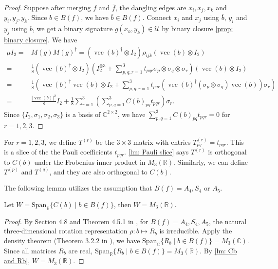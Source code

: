 \begin{proof}
    Suppose after merging $f$ and $\overline{f}$, the dangling edges are $x_i,x_j,x_k$ and $y_i,y_j,y_k$.
    Since $b\in B(f)$, we have $\overline{b}\in B(f)$.
    Connect $x_i$ and $x_j$ using $\overline{b}$, $y_i$ and $y_j$ using $b$, we get a binary signature $g(x_k,y_k)\in \mathcal{U}$ by binary closure \cref{prop: binary closure}.
    We have
    \begin{equation*}
        \begin{aligned}
            \mu I_2
            =&M(g)M(g)^{\dagger}=(\operatorname{vec}(b)^\dagger \otimes I_2) \rho_{ijk}(\operatorname{vec}(b) \otimes I_2)\\
            =&\frac{1}{8}(\operatorname{vec}(b)^\dagger \otimes I_2)\left(I_2^{\otimes3}+\sum_{p,q,r=1}^3 t_{pqr} \sigma_p\otimes\sigma_q\otimes\sigma_r\right)(\operatorname{vec}(b) \otimes I_2)\\
            =& \frac{1}{8}\left(\operatorname{vec}(b)^{\dagger}\operatorname{vec}(b)\otimes I_2+\sum_{p,q,r=1}^3t_{pqr}(\operatorname{vec}(b)^\dagger (\sigma_p\otimes\sigma_q) \operatorname{vec}(b))\sigma_r\right)\\
            =&\frac{|\operatorname{vec}(b)|^2}{8}I_2+\frac{1}{8}\sum_{r=1}^3\left(\sum_{p,q=1}^3 C(b)_{pq}t_{pqr}\right)\sigma_r.&
        \end{aligned}
    \end{equation*}
    Since $\{I_2,\sigma_1,\sigma_2,\sigma_3\}$ is a basis of $\mathbb{C}^{2\times 2}$, we have $\sum_{p,q=1}^3 C(b)_{pq}t_{pqr}=0$ for $r=1,2,3.$
\end{proof}
\begin{remark}
    For $r=1,2,3$, we define $T^{(r)}$ be the $3\times 3$ matrix with entries $T^{(r)}_{pq}=t_{pqr}$.
    This is a slice of the the Pauli coefficients $t_{pqr}.$
    \cref{lm: Pauli slice} says $T^{(r)}$ is orthogonal to $C(b)$ under the Frobenius inner product in $M_3(\mathbb{R}).$
    Similarly, we can define $T^{(p)}$ and $T^{(q)}$, and they are also orthogonal to $C(b)$.
\end{remark}

The following lemma utilizes the assumption that $B(f)=A_4,S_4$ or $A_5$.
\begin{lemma}\label{lm: rep lemma}
    Let $W=\mathrm{Span}_{\mathbb{R}}\{C(b)\mid b\in B(f)\}$, then $W=M_3(\mathbb{R})$.
\end{lemma}
\begin{proof}
    By Section 4.8 and Theorem 4.5.1 in \cite{reptheory}, for $B(f)=A_4,S_4,A_5$, the natural three-dimensional rotation representation $\rho:b\mapsto R_b$ is irreducible.
    Apply the density theorem (Theorem 3.2.2 in \cite{reptheory}), we have $\mathrm{Span}_{\mathbb{C}}\{R_b\mid b\in B(f)\}=M_3(\mathbb{C})$.
    Since all matrices $R_b$ are real, $\mathrm{Span}_{\mathbb{R}}\{R_b\mid b\in B(f)\}=M_3(\mathbb{R})$.
    By \cref{lm: Cb and Rb}, $W=M_3(\mathbb{R}).$
\end{proof}

